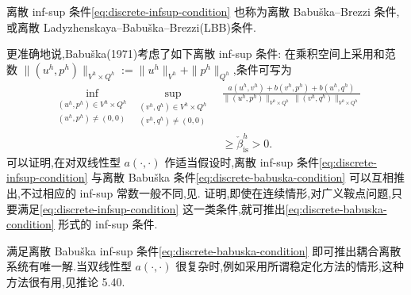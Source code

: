 \begin{note}[Babuška 条件]\label{note:discrete-babuska-condition}
离散 inf-sup 条件\cref{eq:discrete-infsup-condition} 也称为离散 Babuška--Brezzi 条件,或离散 Ladyzhenskaya--Babuška--Brezzi(LBB)条件.

更准确地说,Babuška(1971)考虑了如下离散 inf-sup 条件:
在乘积空间上采用和范数 $\|(u^h,p^h)\|_{V^h\times Q^h}:=\|u^h\|_{V^h}+\|p^h\|_{Q^h}$,条件可写为
\begin{equation}\label{eq:discrete-babuska-condition}
\begin{aligned}
  \inf_{\substack{(u^h,p^h)\in V^h\times Q^h\\(u^h,p^h)\ne(0,0)}}
  \sup_{\substack{(v^h,q^h)\in V^h\times Q^h\\(v^h,q^h)\ne(0,0)}}
  &\frac{a(u^h,v^h)+b(v^h,p^h)+b(u^h,q^h)}
       {\|(u^h,p^h)\|_{V^h\times Q^h}\,
        \|(v^h,q^h)\|_{V^h\times Q^h}}\\
  &\ge\check\beta_{\mathrm{is}}^h>0.
\end{aligned}
\end{equation}
可以证明,在对双线性型 $a(\cdot,\cdot)$ 作适当假设时,离散 inf-sup 条件\cref{eq:discrete-infsup-condition} 与离散 Babuška 条件\cref{eq:discrete-babuska-condition} 可以互相推出,不过相应的 inf-sup 常数一般不同,见\textcite{XuZikatanov2003,Demkowicz2006}.\textcite{BraessBloemer1990} 证明,即使在连续情形,对广义鞍点问题,只要满足\cref{eq:discrete-infsup-condition} 这一类条件,就可推出\cref{eq:discrete-babuska-condition} 形式的 inf-sup 条件.

满足离散 Babuška inf-sup 条件\cref{eq:discrete-babuska-condition} 即可推出耦合离散系统有唯一解.当双线性型 $a(\cdot,\cdot)$ 很复杂时,例如采用所谓稳定化方法的情形,这种方法很有用,见推论 5.40.
\end{note}

